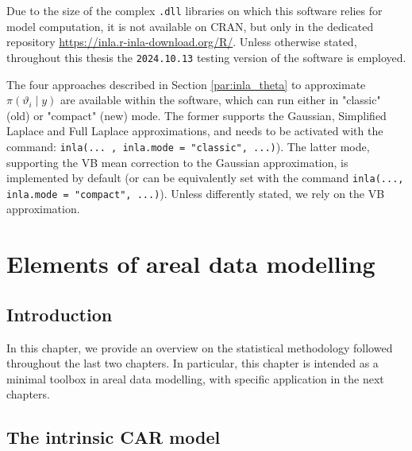 \documentclass[openany]{book}
\begin{document}

Due to the size of the complex \texttt{.dll} libraries on which this software relies for model computation, it is not available on CRAN, but only in the dedicated repository \url{https://inla.r-inla-download.org/R/}. Unless otherwise stated, throughout this thesis the \texttt{2024.10.13} testing version of the software is employed.

The four approaches described in Section \ref{par:inla_theta} to approximate $\pi(\vartheta_i \mid y)$ are available within the software, which can run either in "classic" (old) or "compact" (new) mode. The former supports the Gaussian, Simplified Laplace and Full Laplace approximations, and needs to be activated with the command: \texttt{inla(... , inla.mode = "classic", ...)}). The latter mode, supporting the VB mean correction to the Gaussian approximation, is implemented by default (or can be equivalently set with the command \texttt{inla(..., inla.mode = "compact", ...)}). Unless differently stated, we rely on the VB approximation. 







%
%

\chapter{Elements of areal data modelling} \label{chapter:theory}
\section{Introduction}
In this chapter, we provide an overview on the statistical methodology followed throughout the last two chapters. In particular, this chapter is intended as a minimal toolbox in areal data modelling, with specific application in the next chapters.

\section{The intrinsic CAR model}
\end{document}
